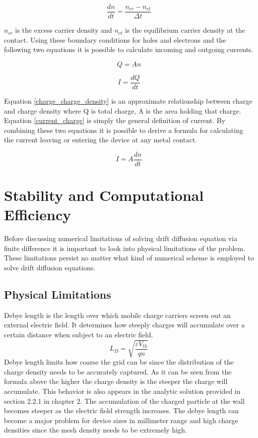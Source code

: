 \begin{doublespace}
\begin{equation}
\frac{dn}{dt}=\frac{n_{cr}-n_{ct}}{\Delta t}
\end{equation}

$n_{cr}$ is the excess carrier density and $n_{ct}$ is the equilibrium carrier density at the contact. Using these boundary conditions for holes and electrons and the following two equations it is possible to calculate incoming and outgoing currents. 

\begin{equation}
Q=An
\label{charge_charge_density}
\end{equation} 

\begin{equation}
I=\frac{dQ}{dt}
\label{current_charge}
\end{equation} 
 

Equation \ref{charge_charge_density} is an approximate relationship between charge and charge density where Q is total charge, A is the area holding that charge. Equation \ref{current_charge} is simply the general definition of current. By combining these two equations it is possible to derive a formula for calculating the current leaving or entering the device at any metal contact.

\begin{equation}
I=A \frac{dn}{dt}
\label{current_charge_density}
\end{equation}


\section{Stability and Computational Efficiency}
Before discussing numerical limitations of solving drift diffusion equation via finite difference it is important to look into physical limitations of the problem. These limitations persist no matter what kind of numerical scheme is employed to solve drift diffusion equations.

\subsection{Physical Limitations}
Debye length is the length over which mobile charge carriers screen out an external electric field. It determines how steeply charges will accumulate over a certain distance when subject to an electric field. 
\begin{equation}
L_D=\sqrt{\frac{\varepsilon V_{th}}{q n}}
\label{debye}
\end{equation}
Debye length limits how coarse the grid can be since the distribution of the charge density needs to be accurately captured. As it can be seen from the formula above the higher the charge density is the steeper the charge will accumulate. This behavior is also appears in the analytic solution provided in section 2.2.1 in chapter 2. The accumulation of the charged particle at the wall becomes steeper as the electric field strength increases. The debye length can become a major problem for device sizes in millimeter range and high charge densities since the mesh density needs to be extremely high.


\end{doublespace}
